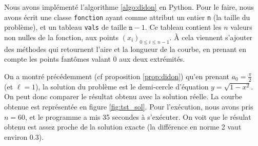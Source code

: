 \documentclass[10pt,a4paper]{article}
\theoremstyle{plain}
\theoremstyle{definition}
\begin{document}
Nous avons implémenté l'algorithme \ref{algo:didon} en Python. Pour le faire, nous avons écrit une classe \texttt{fonction} ayant comme attribut un entier \texttt{n} (la taille du problème), et un tableau \texttt{vals} de taille $\texttt{n}-1$. Ce tableau contient les $n$ valeurs non nulles de la fonction, aux points $(x_i)_{0\leqslant i\leqslant n-1}$. À cela viennent s'ajouter des méthodes qui retournent l'aire et la longueur de la courbe, en prenant en compte les points \og fantômes \fg{} valant 0 aux deux extrémités.

\vspace*{\baselineskip}

On a montré précédemment (cf proposition \ref{prop:didon}) qu'en prenant $a_0=\frac{\pi}{2}$ (et $\ell=1$), la solution du problème est le demi-cercle d'équation $y=\sqrt{1-x^2}$. On peut donc comparer le résultat obtenu avec la solution réelle. La courbe obtenue est représentée en figure \ref{fig:tst_sol}. Pour l'exécution, nous avons pris $n=60$, et le programme a mis 35 secondes à s'exécuter. On voit que le résulat obtenu est assez proche de la solution exacte (la différence en norme 2 vaut environ 0.3).
\end{document}
